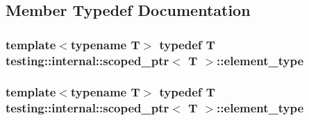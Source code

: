 \subsection{Member Typedef Documentation}
\hypertarget{classtesting_1_1internal_1_1scoped__ptr_ae755ffeebada8e20b68c1d1ffa91cf13}{
\subsubsection[{element\-\_\-type}]{\setlength{\rightskip}{0pt plus 5cm}template$<$typename T$>$ typedef T {\bf testing\-::internal\-::scoped\-\_\-ptr}$<$ T $>$\-::{\bf element\-\_\-type}}}\label{classtesting_1_1internal_1_1scoped__ptr_ae755ffeebada8e20b68c1d1ffa91cf13}
\hypertarget{classtesting_1_1internal_1_1scoped__ptr_ae755ffeebada8e20b68c1d1ffa91cf13}{
\subsubsection[{element\-\_\-type}]{\setlength{\rightskip}{0pt plus 5cm}template$<$typename T$>$ typedef T {\bf testing\-::internal\-::scoped\-\_\-ptr}$<$ T $>$\-::{\bf element\-\_\-type}}}\label{classtesting_1_1internal_1_1scoped__ptr_ae755ffeebada8e20b68c1d1ffa91cf13}


